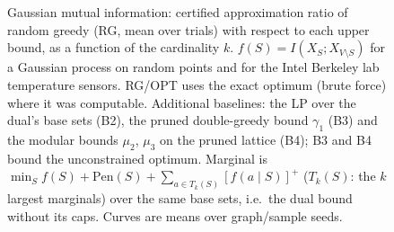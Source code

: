 \begin{figure}[t]
\centering
\setlength{\rgplotwidth}{0.49\columnwidth}
\\[1pt]
\hfill
\\

\caption{Gaussian mutual information: certified approximation ratio of random greedy (RG, mean over trials) with respect to each upper bound, as a function of the cardinality $k$. $f(S)=I(X_S;X_{V\setminus S})$ for a Gaussian process on random points and for the Intel Berkeley lab temperature sensors. RG/OPT uses the exact optimum (brute force) where it was computable. Additional baselines: the LP over the dual's base sets (B2), the pruned double-greedy bound $\gamma_1$ (B3) and the modular bounds $\mu_2$, $\mu_3$ on the pruned lattice (B4); B3 and B4 bound the unconstrained optimum. Marginal is $\min_S f(S)+\mathrm{Pen}(S)+\sum_{a\in T_k(S)}[f(a\mid S)]^+$ ($T_k(S)$: the $k$ largest marginals) over the same base sets, i.e.\ the dual bound without its caps. Curves are means over graph/sample seeds.}
\label{fig:rg-gaussian_mi-baselines}
\end{figure}
